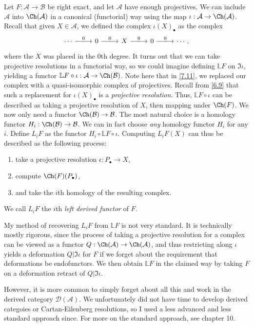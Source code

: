 \begin{construction}\label{7.12}
	Let $F : \mathcal{A}  \to \mathcal{B} $ be right exact, and let $\mathcal{A} $ have enough projectives. We can include $\mathcal{A} $ into $\Ch(\mathcal{A} ) $ in a canonical (functorial) way using the map $\iota : \mathcal{A}  \to \Ch(\mathcal{A} ) $. Recall that given $X\in \mathcal{A} $, we defined the complex $\iota (X)_{\bullet} $ as the complex
	\[\begin{tikzcd}[row sep = 2.5em, column sep = 2.5em]
	\cdots\ar[" 0 ", r]  & 0\ar[" 0 ", r]  & X\ar[" 0 ", r]  & 0\ar[" 0 ", r]  & \cdots,
	\end{tikzcd}\]
	where the $X$ was placed in the 0th degree. It turns out that we can take projective resolutions in a functorial way, so we could imagine defining $\mathbb{L} F$ on $\Im \iota $, yielding a functor $\mathbb{L} F\circ \iota : \mathcal{A}  \to \Ch(\mathcal{B} ) $. Note here that in \cref{7.11}, we replaced our complex with a quasi-isomorphic complex of projectives. Recall from \cref{6.9} that such a replacement for $\iota (X)_{\bullet} $ is a \emph{projective resolution}. Thus, $\mathbb{L} F\circ \iota $ can be described as taking a projective resolution of $X$, then mapping under $\Ch(F) $. We now only need a functor $\Ch(\mathcal{B} ) \to \mathcal{B} $. The most natural choice is a homology functor $H_i : \Ch(\mathcal{B} )  \to \mathcal{B} $. We can in fact choose \emph{any} homology functor $H_i$ for any $i$. Define $L_iF$ as the functor $H_i \circ \mathbb{L} F\circ \iota $. Computing $L_iF(X)$ can thus be described as the following process:
	\begin{enumerate}
		\item take a projective resolution $\epsilon : P_{\bullet}  \to X$,
		\item compute $\Ch(F) (P_{\bullet} )$,
		\item and take the $i$th homology of the resulting complex.
	\end{enumerate}
	We call $L_iF$ the $i$th \emph{left derived functor} of $F$.
\end{construction}

\begin{remark}\label{7.13}
	My method of recovering $L_iF$ from $\mathbb{L} F$ is not very standard. It is technically mostly rigorous, since the process of taking a projective resolution for a complex can be viewed as a functor $Q : \Ch(\mathcal{A} )  \to \Ch(\mathcal{A} ) $, and thus restricting along $\iota $ yields a deformation $Q|\Im \iota $ for $F$ if we forget about the requirement that deformations be endofunctors. We then obtain $\mathbb{L} F$ in the claimed way by taking $F$ on a deformation retract of $Q|\Im \iota $.

	However, it is more common to simply forget about all this and work in the derived category $\mathcal{D} (\mathcal{A} )$. We unfortunately did not have time to develop derived categoies or Cartan-Eilenberg resolutions, so I used a less advanced and less standard approach since. For more on the standard approach, see \cite{weibel} chapter 10.
\end{remark}

